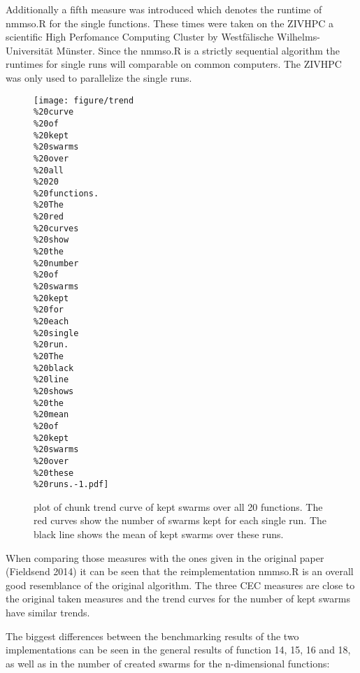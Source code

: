 \documentclass[12pt,a4paper]{article}
\begin{document}
Additionally a fifth measure was introduced which denotes the runtime of
nmmso.R for the single functions. These times were taken on the ZIVHPC a
scientific High Perfomance Computing Cluster by Westfälische
Wilhelms-Universität Münster. Since the nmmso.R is a strictly sequential
algorithm the runtimes for single runs will comparable on common
computers. The ZIVHPC was only used to parallelize the single runs.

\begin{figure}[htbp]
\centering
\texttt{[image: figure/trend\\\%20curve\\\%20of\\\%20kept\\\%20swarms\\\%20over\\\%20all\\\%2020\\\%20functions.\\\%20The\\\%20red\\\%20curves\\\%20show\\\%20the\\\%20number\\\%20of\\\%20swarms\\\%20kept\\\%20for\\\%20each\\\%20single\\\%20run.\\\%20The\\\%20black\\\%20line\\\%20shows\\\%20the\\\%20mean\\\%20of\\\%20kept\\\%20swarms\\\%20over\\\%20these\\\%20runs.-1.pdf]}
\caption{plot of chunk trend curve of kept swarms over all 20 functions.
The red curves show the number of swarms kept for each single run. The
black line shows the mean of kept swarms over these runs.}
\end{figure}

When comparing those measures with the ones given in the original paper
(Fieldsend 2014) it can be seen that the reimplementation nmmso.R is an
overall good resemblance of the original algorithm. The three CEC
measures are close to the original taken measures and the trend curves
for the number of kept swarms have similar trends.

The biggest differences between the benchmarking results of the two
implementations can be seen in the general results of function 14, 15,
16 and 18, as well as in the number of created swarms for the
n-dimensional functions:
\end{document}
